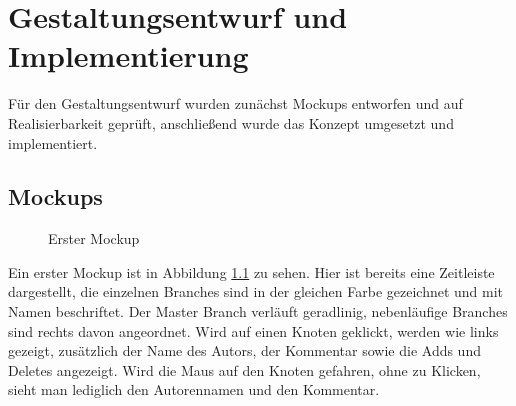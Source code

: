 \documentclass[nocolor]{tudbook}
\begin{document}
\chapter{Gestaltungsentwurf und Implementierung}
Für den Gestaltungsentwurf wurden zunächst Mockups entworfen und auf Realisierbarkeit geprüft, anschließend wurde das Konzept umgesetzt und implementiert.
\section{Mockups}
\begin{figure}
\caption{Erster Mockup}
\label{fig:mockup1}
\end{figure}

Ein erster Mockup ist in Abbildung \ref{fig:mockup1} zu sehen. Hier ist bereits eine Zeitleiste dargestellt, die einzelnen Branches sind in der gleichen Farbe gezeichnet und mit Namen beschriftet. Der Master Branch verläuft geradlinig, nebenläufige Branches sind rechts davon angeordnet. Wird auf einen Knoten geklickt, werden wie links gezeigt, zusätzlich der Name des Autors, der Kommentar sowie die Adds und Deletes angezeigt. Wird die Maus auf den Knoten gefahren, ohne zu Klicken, sieht man lediglich den Autorennamen und den Kommentar. 
\end{document}
